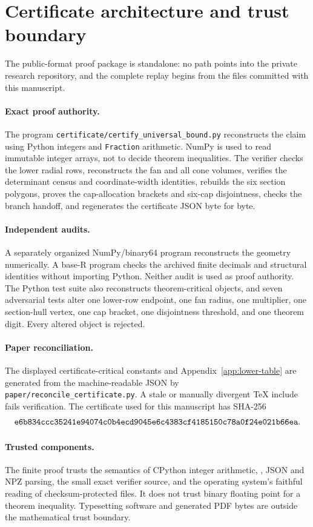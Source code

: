 \documentclass[11pt,reqno]{amsart}
\theoremstyle{remark}
\begin{document}
\section{Certificate architecture and trust boundary}
\label{sec:certificate}

The public-format proof package is standalone: no path points into the private
research repository, and the complete replay begins from the files committed
with this manuscript.

\paragraph{Exact proof authority.}
The program \texttt{certificate/certify\_universal\_bound.py} reconstructs the
claim using Python integers and \texttt{Fraction} arithmetic.  NumPy is used to
read immutable integer arrays, not to decide theorem inequalities.  The
verifier checks the lower radial rows, reconstructs the fan and all cone
volumes, verifies the determinant census and coordinate-width identities,
rebuilds the six section polygons, proves the cap-allocation brackets and
six-cap disjointness, checks the branch handoff, and regenerates the certificate
JSON byte for byte.

\paragraph{Independent audits.}
A separately organized NumPy/binary64 program reconstructs the geometry
numerically.  A base-R program checks the archived finite decimals and
structural identities without importing Python.  Neither audit is used as proof
authority.  The Python test suite also reconstructs theorem-critical objects,
and seven adversarial tests alter one lower-row endpoint, one fan radius, one
multiplier, one section-hull vertex, one cap bracket, one disjointness threshold,
and one theorem digit.  Every altered object is rejected.

\paragraph{Paper reconciliation.}
The displayed certificate-critical constants and Appendix~\ref{app:lower-table}
are generated from the machine-readable JSON by
\texttt{paper/reconcile\_certificate.py}.  A stale or manually divergent TeX
include fails verification.  The certificate used for this manuscript has
SHA-256
\[
 \texttt{e6b834ccc35241e94074c0b4ecd9045e6c4383cf4185150c78a0f24e021b66ea}.
\]

\paragraph{Trusted components.}
The finite proof trusts the semantics of CPython integer arithmetic,
, JSON and NPZ parsing, the small exact verifier
source, and the operating system's faithful reading of checksum-protected
files.  It does not trust binary floating point for a theorem inequality.
Typesetting software and generated PDF bytes are outside the mathematical trust
boundary.
\end{document}

